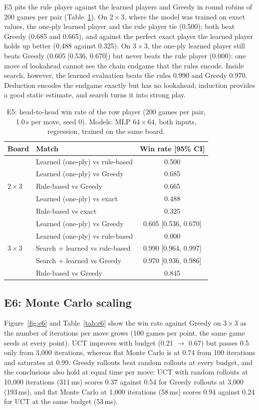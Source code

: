 \documentclass[11pt,a4paper]{article}
\newcommand{\bd}[2]{$#1{\times}#2$}            %
\begin{document}
E5 pits the rule player against the learned players and Greedy in round robins of 200
games per pair (Table~\ref{tab:e5}). On \bd{2}{3}, where the model was trained on exact
values, the one-ply learned player and the rule player tie (0.500); both beat Greedy (0.685
and 0.665), and against the perfect exact player the learned player holds up better (0.488
against 0.325). On \bd{3}{3}, the one-ply
learned player still beats Greedy (0.605 [0.536, 0.670]) but never beats the rule player
(0.000): one move of lookahead cannot see the chain endgame that the rules encode.
Inside search, however, the learned evaluation beats the rules 0.990 and Greedy 0.970.
Deduction encodes the endgame exactly but has no lookahead; induction provides a good
static estimate, and search turns it into strong play.

\begin{table}[htbp]
\centering
\caption{E5: head-to-head win rate of the row player (200 games per pair, 1.0\,s per move,
seed 0). Models: MLP $64{\times}64$, both inputs, regression, trained on the same board.}
\label{tab:e5}
\begin{tabular}{llc}
\toprule
Board & Match & Win rate [95\% CI] \\
\midrule
\multirow{5}{*}{\bd{2}{3}} & Learned (one-ply) vs rule-based & 0.500 \\
 & Learned (one-ply) vs Greedy & 0.685 \\
 & Rule-based vs Greedy & 0.665 \\
 & Learned (one-ply) vs exact & 0.488 \\
 & Rule-based vs exact & 0.325 \\
\midrule
\multirow{5}{*}{\bd{3}{3}} & Learned (one-ply) vs Greedy & 0.605 [0.536, 0.670] \\
 & Learned (one-ply) vs rule-based & 0.000 \\
 & Search + learned vs rule-based & 0.990 [0.964, 0.997] \\
 & Search + learned vs Greedy & 0.970 [0.936, 0.986] \\
 & Rule-based vs Greedy & 0.845 \\
\bottomrule
\end{tabular}
\end{table}

\FloatBarrier
\subsection{E6: Monte Carlo scaling}

Figure~\ref{fig:e6} and Table~\ref{tab:e6} show the win rate against Greedy on \bd{3}{3} as the
number of iterations per move grows (100 games per point, the same game seeds at every
point). UCT improves with budget (0.21 $\rightarrow$ 0.67) but passes 0.5 only from 3{,}000
iterations, whereas flat Monte Carlo is at 0.74 from 100 iterations and saturates at 0.99.
Greedy rollouts beat random rollouts at every budget, and the conclusions also hold at
equal time per move: UCT with random rollouts at 10{,}000 iterations (311\,ms) scores 0.37
against 0.54 for Greedy rollouts at 3{,}000 (193\,ms), and flat Monte Carlo at 1{,}000
iterations (58\,ms) scores 0.94 against 0.24 for UCT at the same budget (53\,ms).
\end{document}
